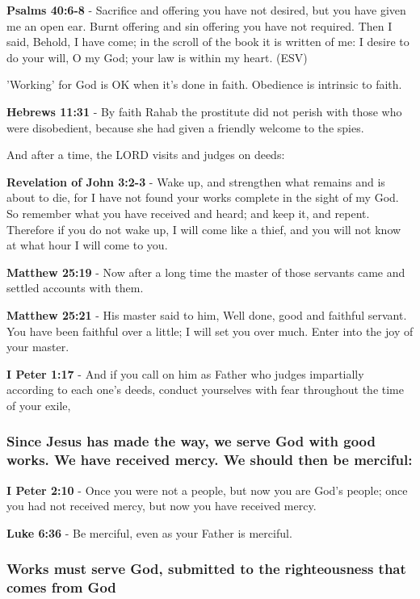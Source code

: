 \documentclass[11pt]{article}
\begin{document}
\textbf{Psalms 40:6-8} - Sacrifice and offering you have not desired, but you have given me an open ear. Burnt offering and sin offering you have not required. Then I said, Behold, I have come; in the scroll of the book it is written of me: I desire to do your will, O my God; your law is within my heart. (ESV)

'Working' for God is OK when it's done in faith.
Obedience is intrinsic to faith.

\textbf{Hebrews 11:31} - By faith Rahab the prostitute did not perish with those who were disobedient, because she had given a friendly welcome to the spies.

And after a time, the LORD visits and judges on deeds:

\textbf{Revelation of John 3:2-3} - Wake up, and strengthen what remains and is about to die, for I have not found your works complete in the sight of my God. So remember what you have received and heard; and keep it, and repent. Therefore if you do not wake up, I will come like a thief, and you will not know at what hour I will come to you.

\textbf{Matthew 25:19} - Now after a long time the master of those servants came and settled accounts with them.

\textbf{Matthew 25:21} - His master said to him, Well done, good and faithful servant. You have been faithful over a little; I will set you over much. Enter into the joy of your master.

\textbf{I Peter 1:17} - And if you call on him as Father who judges impartially according to each one's deeds, conduct yourselves with fear throughout the time of your exile,

\subsubsection{Since Jesus has made the way, we serve God with good works. We have received mercy. We should then be merciful:}
\label{sec:orgff80def}
\textbf{I Peter 2:10} - Once you were not a people, but now you are God's people; once you had not received mercy, but now you have received mercy.

\textbf{Luke 6:36} - Be merciful, even as your Father is merciful.

\subsubsection{Works must serve God, submitted to the righteousness that comes from God}
\label{sec:org7179f72}
\end{document}
